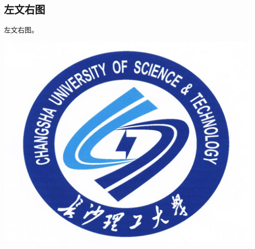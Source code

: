 \documentclass[dvipsnames, svgnames, x11names]{beamer}
\begin{document}
\subsection{左文右图}
\begin{frame}
    \begin{minipage}{.5\linewidth}
        左文右图。
    \end{minipage}
    \quad\quad
    \begin{minipage}{.4\linewidth}
    \includegraphics[width=\linewidth]{figure/csustlogo_2640by2170_as_example.jpg}
    \end{minipage}
\end{frame}
\end{document}
